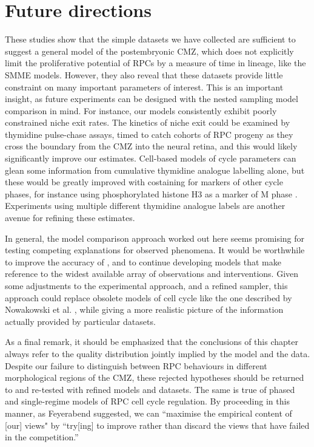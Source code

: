 \section{Future directions}
These studies show that the simple datasets we have collected are sufficient to suggest a general model of the postembryonic CMZ, which does not explicitly limit the proliferative potential of RPCs by a measure of time in lineage, like the SMME models. However, they also reveal that these datasets provide little constraint on many important parameters of interest. This is an important insight, as future experiments can be designed with the nested sampling model comparison in mind. For instance, our models consistently exhibit poorly constrained niche exit rates. The kinetics of niche exit could be examined by thymidine pulse-chase assays, timed to catch cohorts of RPC progeny as they cross the boundary from the CMZ into the neural retina, and this would likely significantly improve our estimates. Cell-based models of cycle parameters can glean some information from cumulative thymidine analogue labelling alone, but these would be greatly improved with costaining for markers of other cycle phases, for instance using phosphorylated histone H3 as a marker of M phase \cite{Ren2018}. Experiments using multiple different thymidine analogue labels \cite{Harris2018} are another avenue for refining these estimates.

In general, the model comparison approach worked out here seems promising for testing competing explanations for observed phenomena. It would be worthwhile to improve the accuracy of \hyperref[chap:GMC]{}, and to continue developing models that make reference to the widest available array of observations and interventions. Given some adjustments to the experimental approach, and a refined sampler, this approach could replace obsolete models of cell cycle like the one described by Nowakowski et al. \cite{Nowakowski1989}, while giving a more realistic picture of the information actually provided by particular datasets.

As a final remark, it should be emphasized that the conclusions of this chapter always refer to the quality distribution jointly implied by the model and the data. Despite our failure to distinguish between RPC behaviours in different morphological regions of the CMZ, these rejected hypotheses should be returned to and re-tested with refined models and datasets. The same is true of phased and single-regime models of RPC cell cycle regulation. By proceeding in this manner, as Feyerabend suggested, we can ``maximise the empirical content of [our] views" by ``try[ing] to improve rather than discard the views that have failed in the competition.'' \cite[p.20]{Feyerabend1993}